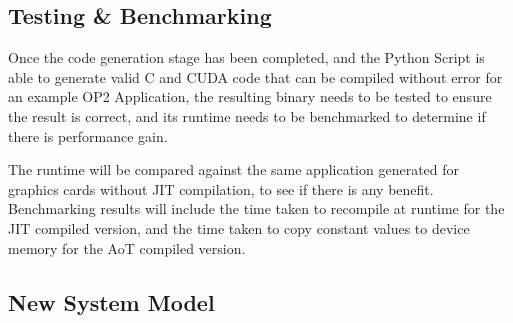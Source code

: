\subsection{Testing \& Benchmarking}
Once the code generation stage has been completed, and the Python Script is able to generate valid C and CUDA code that can be compiled without error for an example OP2 Application, the resulting binary needs to be tested to ensure the result is correct, and its runtime needs to be benchmarked to determine if there is performance gain.
\par
The runtime will be compared against the same application generated for graphics cards without JIT compilation, to see if there is any benefit. Benchmarking results will include the time taken to recompile at runtime for the JIT compiled version, and the time taken to copy constant values to device memory for the AoT compiled version.


\clearpage
\subsection{New System Model}

